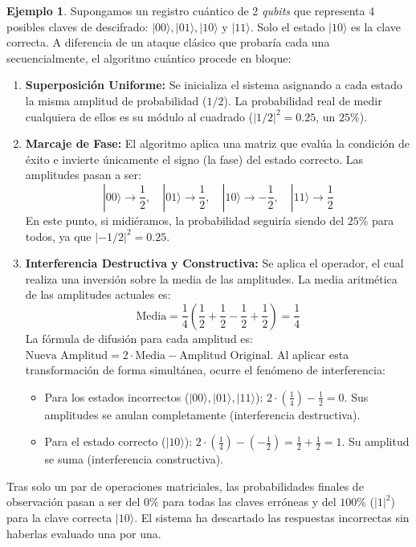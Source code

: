 \documentclass[11pt, a4paper]{report}
\theoremstyle{definition}
\newtheorem{ejemplo}{Ejemplo}[chapter]
\begin{document}
\begin{ejemplo}
\label{ex:interferencia_cuantica}
Supongamos un registro cuántico de 2 \textit{qubits} que representa 4 posibles claves de descifrado: $|00\rangle, |01\rangle, |10\rangle$ y $|11\rangle$. Solo el estado $|10\rangle$ es la clave correcta. A diferencia de un ataque clásico que probaría cada una secuencialmente, el algoritmo cuántico procede en bloque:

\begin{enumerate}
    \item \textbf{Superposición Uniforme:} Se inicializa el sistema asignando a cada estado la misma amplitud de probabilidad ($1/2$). La probabilidad real de medir cualquiera de ellos es su módulo al cuadrado ($|1/2|^2 = 0.25$, un $25\%$).
    
    \item \textbf{Marcaje de Fase:} El algoritmo aplica una matriz que evalúa la condición de éxito e invierte únicamente el signo (la fase) del estado correcto. Las amplitudes pasan a ser:
    $$ |00\rangle \to \frac{1}{2}, \quad |01\rangle \to \frac{1}{2}, \quad |10\rangle \to -\frac{1}{2}, \quad |11\rangle \to \frac{1}{2} $$
    En este punto, si midiéramos, la probabilidad seguiría siendo del $25\%$ para todos, ya que $|-1/2|^2 = 0.25$.
    
    \item \textbf{Interferencia Destructiva y Constructiva:} Se aplica el operador, el cual realiza una inversión sobre la media de las amplitudes. La media aritmética de las amplitudes actuales es:
    $$ \text{Media} = \frac{1}{4} \left( \frac{1}{2} + \frac{1}{2} - \frac{1}{2} + \frac{1}{2} \right) = \frac{1}{4} $$
    La fórmula de difusión para cada amplitud es: $\text{Nueva Amplitud} = 2 \cdot \text{Media} - \text{Amplitud Original}$. Al aplicar esta transformación de forma simultánea, ocurre el fenómeno de interferencia:
    \begin{itemize}
        \item Para los estados incorrectos ($|00\rangle, |01\rangle, |11\rangle$): $2 \cdot \left(\frac{1}{4}\right) - \frac{1}{2} = 0$. Sus amplitudes se anulan completamente (interferencia destructiva).
        \item Para el estado correcto ($|10\rangle$): $2 \cdot \left(\frac{1}{4}\right) - \left(-\frac{1}{2}\right) = \frac{1}{2} + \frac{1}{2} = 1$. Su amplitud se suma (interferencia constructiva).
    \end{itemize}
\end{enumerate}

Tras solo un par de operaciones matriciales, las probabilidades finales de observación pasan a ser del $0\%$ para todas las claves erróneas y del $100\%$ ($|1|^2$) para la clave correcta $|10\rangle$. El sistema ha descartado las respuestas incorrectas sin haberlas evaluado una por una.
\end{ejemplo}
\end{document}
